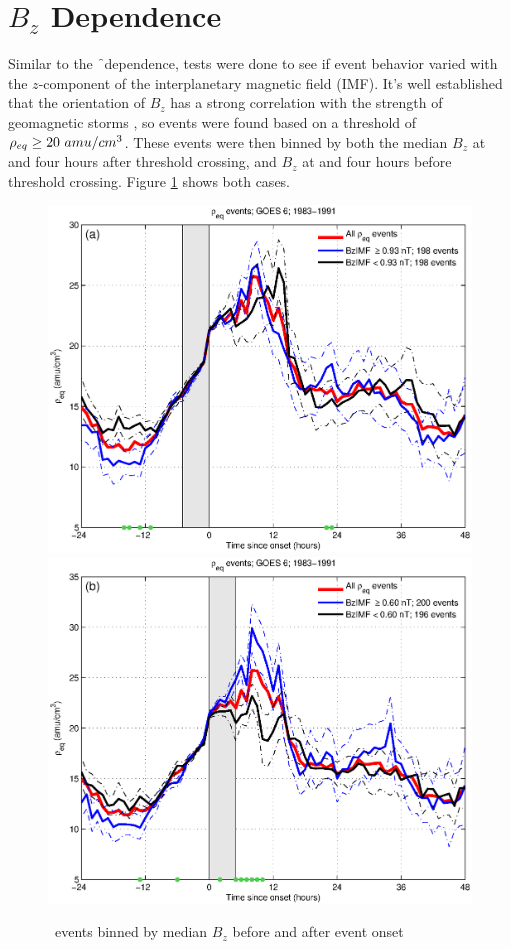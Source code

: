 \section{$B_z$ Dependence}

Similar to the \f\ dependence, tests were done to see if event behavior varied with the $z$-component of the interplanetary magnetic field (IMF). It's well established that the orientation of $B_z$ has a strong correlation with the strength of geomagnetic storms \citep{Takahashi2010SolarCycleVariation}, so events were found based on a threshold of $\rho_{eq} \geq 20~amu/cm^3$. These events were then binned by both the median $B_z$ at and four hours after threshold crossing, and $B_z$ at and four hours before threshold crossing. Figure \ref{fig:RhoBinnedBz} shows both cases.

\begin{figure}[htp!]
	\centering
	\includegraphics[width=0.7\linewidth]{Figures/RhoBinnedBzIMF-case24-t020-tf25-GOES6}
	\includegraphics[width=0.7\linewidth]{Figures/RhoBinnedBzIMF-case24-t025-tf30-GOES6}	
	\caption{\req\ events binned by median $B_z$ before and after event onset}
	\label{fig:RhoBinnedBz}
\end{figure}

